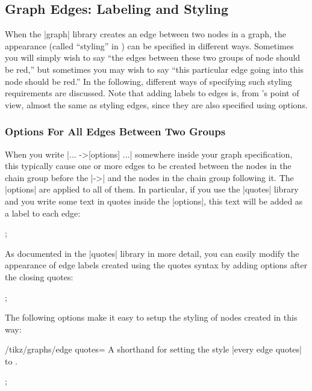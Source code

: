 \subsection{Graph Edges: Labeling and Styling}

When the |graph| library creates an edge between two nodes in a graph,
the appearance (called ``styling'' in \tikzname) can be specified in
different ways. Sometimes you will simply wish to say ``the edges
between these two groups of node should be red,'' but sometimes you
may wish to say ``this particular edge going into this node should be
red.'' In the following, different ways of specifying such styling
requirements are discussed. Note that adding labels to edges is, from
\tikzname's point of view, almost the same as styling edges, since
they are also specified using options.


\subsubsection{Options For All Edges Between Two Groups}

When you write |... ->[options] ...| somewhere inside your graph
specification, this typically cause one or more edges to be created
between the nodes in the chain group before the |->| and the nodes in
the chain group following it. The |options| are applied to all of
them. In particular, if you use the |quotes| library and you write
some text in quotes inside the |options|, this text will be added as a
label to each edge:

\begin{codeexample}[]
\tikz 
  ;
\end{codeexample}

As documented in the |quotes| library in more detail, you can easily
modify the appearance of edge labels created using the quotes syntax
by adding options after the closing quotes:

\begin{codeexample}[]
\tikz {};
\end{codeexample}

The following options make it easy to setup the styling of nodes
created in this way:

\begin{key}{/tikz/graphs/edge quotes=}
  A shorthand for setting the style |every edge quotes| to .  
\begin{codeexample}[]
  \tikz {};
\end{codeexample}
\end{key}

